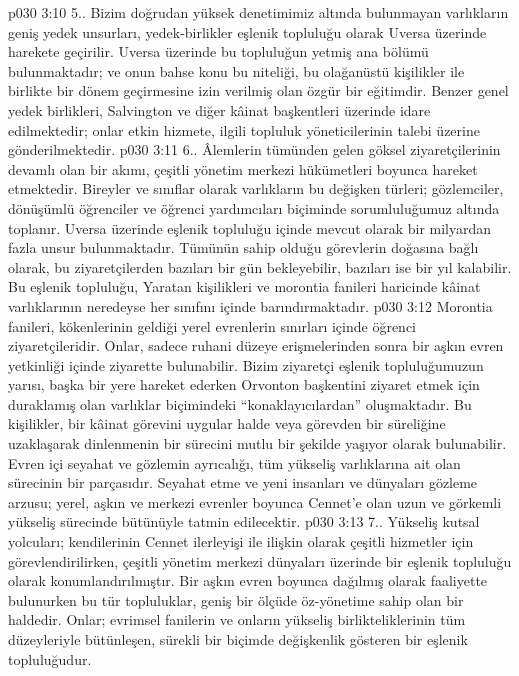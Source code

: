 \vs p030 3:10 5.\bibnobreakspace {}. Bizim doğrudan yüksek denetimimiz altında bulunmayan varlıkların geniş yedek unsurları, yedek\hyp{}birlikler eşlenik topluluğu olarak Uversa üzerinde harekete geçirilir. Uversa üzerinde bu topluluğun yetmiş ana bölümü bulunmaktadır; ve onun bahse konu bu niteliği, bu olağanüstü kişilikler ile birlikte bir dönem geçirmesine izin verilmiş olan özgür bir eğitimdir. Benzer genel yedek birlikleri, Salvington ve diğer kâinat başkentleri üzerinde idare edilmektedir; onlar etkin hizmete, ilgili topluluk yöneticilerinin talebi üzerine gönderilmektedir.
\vs p030 3:11 6.\bibnobreakspace {}. Âlemlerin tümünden gelen göksel ziyaretçilerinin devamlı olan bir akımı, çeşitli yönetim merkezi hükümetleri boyunca hareket etmektedir. Bireyler ve sınıflar olarak varlıkların bu değişken türleri; gözlemciler, dönüşümlü öğrenciler ve öğrenci yardımcıları biçiminde sorumluluğumuz altında toplanır. Uversa üzerinde eşlenik topluluğu içinde mevcut olarak bir milyardan fazla unsur bulunmaktadır. Tümünün sahip olduğu görevlerin doğasına bağlı olarak, bu ziyaretçilerden bazıları bir gün bekleyebilir, bazıları ise bir yıl kalabilir. Bu eşlenik topluluğu, Yaratan kişilikleri ve morontia fanileri haricinde kâinat varlıklarının neredeyse her sınıfını içinde barındırmaktadır.
\vs p030 3:12 Morontia fanileri, kökenlerinin geldiği yerel evrenlerin sınırları içinde öğrenci ziyaretçileridir. Onlar, sadece ruhani düzeye erişmelerinden sonra bir aşkın evren yetkinliği içinde ziyarette bulunabilir. Bizim ziyaretçi eşlenik topluluğumuzun yarısı, başka bir yere hareket ederken Orvonton başkentini ziyaret etmek için duraklamış olan varlıklar biçimindeki “konaklayıcılardan” oluşmaktadır. Bu kişilikler, bir kâinat görevini uygular halde veya görevden bir süreliğine uzaklaşarak dinlenmenin bir sürecini mutlu bir şekilde yaşıyor olarak bulunabilir. Evren içi seyahat ve gözlemin ayrıcalığı, tüm yükseliş varlıklarına ait olan sürecinin bir parçasıdır. Seyahat etme ve yeni insanları ve dünyaları gözleme arzusu; yerel, aşkın ve merkezi evrenler boyunca Cennet’e olan uzun ve görkemli yükseliş sürecinde bütünüyle tatmin edilecektir.
\vs p030 3:13 7.\bibnobreakspace {}. Yükseliş kutsal yolcuları; kendilerinin Cennet ilerleyişi ile ilişkin olarak çeşitli hizmetler için görevlendirilirken, çeşitli yönetim merkezi dünyaları üzerinde bir eşlenik topluluğu olarak konumlandırılmıştır. Bir aşkın evren boyunca dağılmış olarak faaliyette bulunurken bu tür topluluklar, geniş bir ölçüde öz\hyp{}yönetime sahip olan bir haldedir. Onlar; evrimsel fanilerin ve onların yükseliş birlikteliklerinin tüm düzeyleriyle bütünleşen, sürekli bir biçimde değişkenlik gösteren bir eşlenik topluluğudur.
